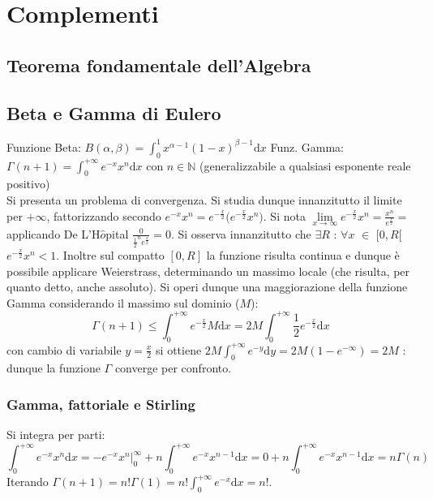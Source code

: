 \documentclass[10pt]{article}
\theoremstyle{plain}
\begin{document}
\section{Complementi}

\subsection{Teorema fondamentale dell'Algebra}

\subsection{Beta e Gamma di Eulero}
Funzione Beta: $\displaystyle B (\alpha, \beta) = \int_0^1 x^{\alpha - 1} (1 - x)^{\beta - 1}\textrm{d}x$  Funz. Gamma: $\displaystyle \Gamma(n+1) = \int_0^{+\infty} e^{-x} x^n\textrm{d}x$ con $n \in \mathbb{N}$ (generalizzabile a qualsiasi esponente reale positivo)
\\Si presenta un problema di convergenza. Si studia dunque innanzitutto il limite per $+\infty$, fattorizzando secondo $\displaystyle e^{-x}x^n = e^{-\frac{x}{2}}\big(e^{-\frac{x}{2}}x^n\big)$. Si nota $\displaystyle \lim \limits_{x \rightarrow \infty} e^{-\frac{x}{2}} x^n = \frac{x^n}{e^{\frac{x}{2}}}=$ applicando De L'H$\hat{o}$pital $\displaystyle \frac{0}{\frac{1}{2}^n e^{\frac{x}{2}}} = 0$.
Si osserva innanzitutto che $\exists R$ : $\forall x $ $\in$ $[0,R[$ $e^{-\frac{x}{2}} x^n < 1$. Inoltre sul compatto $[0,R]$ la funzione risulta continua e dunque è possibile applicare Weierstrass, determinando un massimo locale (che risulta, per quanto detto, anche assoluto).
Si operi dunque una maggiorazione della funzione Gamma considerando il massimo sul dominio ($M$):
\[\Gamma(n+1) \leq \int_0^{+\infty} e^{-\frac{x}{2}} M\textrm{d}x = 2M \int_0^{+\infty} \frac{1}{2} e^{-\frac{x}{2}}\textrm{d}x\]
con cambio di variabile $\displaystyle y = \frac{x}{2}$ si ottiene $\displaystyle 2M \int_0^{+\infty} e^{-y} \textrm{d}y = 2M (1 - e^{-\infty}) = 2M$ : dunque la funzione $\Gamma$ converge per confronto.

\subsubsection{Gamma, fattoriale e Stirling}
Si integra per parti:
\[\int_0^{+\infty} e^{-x} x^n \textrm{d}x = - e^{-x} x^n \bigg|_0^\infty + n \int_0^{+\infty} e^{-x} x^{n-1} \textrm{d}x = 0 + n \int_0^{+\infty} e^{-x} x^{n-1} \textrm{d}x = n \Gamma(n)\]
Iterando $\displaystyle \Gamma(n+1) = n! \Gamma(1) = n! \int_0^{+\infty} e^{-x} \textrm{d}x = n!$.
\end{document}
